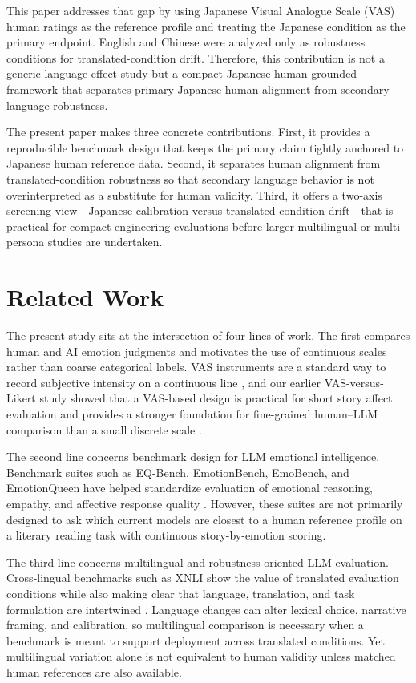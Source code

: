 \documentclass[conference,a4paper]{IEEEtran}
\begin{document}
This paper addresses that gap by using Japanese Visual Analogue Scale (VAS) human ratings as the reference profile and treating the Japanese condition as the primary endpoint. English and Chinese were analyzed only as robustness conditions for translated-condition drift. Therefore, this contribution is not a generic language-effect study but a compact Japanese-human-grounded framework that separates primary Japanese human alignment from secondary-language robustness.

The present paper makes three concrete contributions. First, it provides a reproducible benchmark design that keeps the primary claim tightly anchored to Japanese human reference data. Second, it separates human alignment from translated-condition robustness so that secondary language behavior is not overinterpreted as a substitute for human validity. Third, it offers a two-axis screening view---Japanese calibration versus translated-condition drift---that is practical for compact engineering evaluations before larger multilingual or multi-persona studies are undertaken.

\section{Related Work}
The present study sits at the intersection of four lines of work. The first compares human and AI emotion judgments and motivates the use of continuous scales rather than coarse categorical labels. VAS instruments are a standard way to record subjective intensity on a continuous line \cite{aitken1969vas}, and our earlier VAS-versus-Likert study showed that a VAS-based design is practical for short story affect evaluation and provides a stronger foundation for fine-grained human--LLM comparison than a small discrete scale \cite{shirahama2025vas}.

The second line concerns benchmark design for LLM emotional intelligence. Benchmark suites such as EQ-Bench, EmotionBench, EmoBench, and EmotionQueen have helped standardize evaluation of emotional reasoning, empathy, and affective response quality \cite{paech2024eqbench,huang2024emotionbench,sabour2024emobench,chen2024emotionqueen}. However, these suites are not primarily designed to ask which current models are closest to a human reference profile on a literary reading task with continuous story-by-emotion scoring.

The third line concerns multilingual and robustness-oriented LLM evaluation. Cross-lingual benchmarks such as XNLI show the value of translated evaluation conditions while also making clear that language, translation, and task formulation are intertwined \cite{conneau2018xnli}. Language changes can alter lexical choice, narrative framing, and calibration, so multilingual comparison is necessary when a benchmark is meant to support deployment across translated conditions. Yet multilingual variation alone is not equivalent to human validity unless matched human references are also available.
\end{document}
